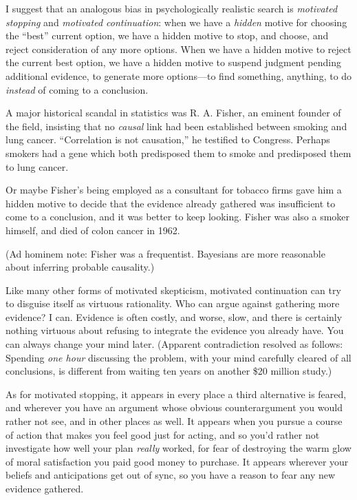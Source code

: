 {
 I suggest that an analogous bias in psychologically realistic
search is \textit{motivated stopping} and \textit{motivated
continuation}: when we have a \textit{hidden} motive for choosing the
``best'' current option, we have a
hidden motive to stop, and choose, and reject consideration of any more
options. When we have a hidden motive to reject the current best
option, we have a hidden motive to suspend judgment pending additional
evidence, to generate more options---to find something, anything, to do
\textit{instead} of coming to a conclusion.}

{
 A major historical scandal in statistics was R. A. Fisher, an
eminent founder of the field, insisting that no \textit{causal} link
had been established between smoking and lung cancer.
``Correlation is not causation,'' he
testified to Congress. Perhaps smokers had a gene which both
predisposed them to smoke and predisposed them to lung cancer.}

{
 Or maybe Fisher's being employed as a consultant
for tobacco firms gave him a hidden motive to decide that the evidence
already gathered was insufficient to come to a conclusion, and it was
better to keep looking. Fisher was also a smoker himself, and died of
colon cancer in 1962.}

{
 (Ad hominem note: Fisher was a frequentist. Bayesians are more
reasonable about inferring probable causality.)}

{
 Like many other forms of motivated skepticism, motivated
continuation can try to disguise itself as virtuous rationality. Who
can argue against gathering more evidence? I can. Evidence is often
costly, and worse, slow, and there is certainly nothing virtuous about
refusing to integrate the evidence you already have. You can always
change your mind later. (Apparent contradiction resolved as follows:
Spending \textit{one hour} discussing the problem, with your mind
carefully cleared of all conclusions, is different from waiting ten
years on another \$20 million study.)}

{
 As for motivated stopping, it appears in every place a third
alternative is feared, and wherever you have an argument whose obvious
counterargument you would rather not see, and in other places as well.
It appears when you pursue a course of action that makes you feel good
just for acting, and so you'd rather not investigate
how well your plan \textit{really} worked, for fear of destroying the
warm glow of moral satisfaction you paid good money to purchase. It
appears wherever your beliefs and anticipations get out of sync, so you
have a reason to fear any new evidence gathered.}


